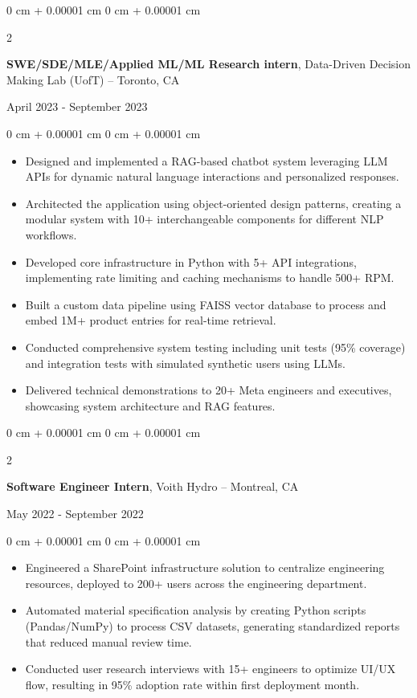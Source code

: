 \documentclass[10pt, letterpaper]{article}
\newenvironment{highlights}{
    \begin{itemize}[
        topsep=0.08 cm,
        parsep=0.08 cm,
        partopsep=0pt,
        itemsep=0pt,
        leftmargin=0.2 cm + 17pt
    ]
}
{
    \end{itemize}
}
\newenvironment{onecolentry}{
    \begin{adjustwidth}{
        0 cm + 0.00001 cm
    }{
        0 cm + 0.00001 cm
    }
}{
    \end{adjustwidth}
}
\newenvironment{twocolentry}[2][]{
    \onecolentry
    \def\secondColumn{#2}
    \setcolumnwidth{\fill, 4.5 cm}
    \begin{paracol}{2}
}{
    \switchcolumn \raggedleft \secondColumn
    \end{paracol}
    \endonecolentry
}
\begin{document}
\begin{twocolentry}{April 2023 - September 2023}
    {\textbf{SWE/SDE/MLE/Applied ML/ML Research intern}}, Data-Driven Decision Making Lab (UofT) -- Toronto, CA
\end{twocolentry}
\vspace{0.1cm}
\begin{onecolentry}
    \begin{highlights}
        \item Designed and implemented a RAG-based chatbot system leveraging LLM APIs for dynamic natural language interactions and personalized responses.
        \item Architected the application using object-oriented design patterns, creating a modular system with 10+ interchangeable components for different NLP workflows.
        \item Developed core infrastructure in Python with 5+ API integrations, implementing rate limiting and caching mechanisms to handle 500+ RPM.
        \item Built a custom data pipeline using FAISS vector database to process and embed 1M+ product entries for real-time retrieval.
        \item Conducted comprehensive system testing including unit tests (95\% coverage) and integration tests with simulated synthetic users using LLMs.
        \item Delivered technical demonstrations to 20+ Meta engineers and executives, showcasing system architecture and RAG features.
    \end{highlights}
\end{onecolentry}
\vspace{0.35 cm}

\begin{twocolentry}{May 2022 - September 2022}
    {\textbf{Software Engineer Intern}}, Voith Hydro -- Montreal, CA
\end{twocolentry}
\vspace{0.1cm}
\begin{onecolentry}
    \begin{highlights}
        \item Engineered a SharePoint infrastructure solution to centralize engineering resources, deployed to 200+ users across the engineering department.
        \item Automated material specification analysis by creating Python scripts (Pandas/NumPy) to process CSV datasets, generating standardized reports that reduced manual review time.
        \item Conducted user research interviews with 15+ engineers to optimize UI/UX flow, resulting in 95\% adoption rate within first deployment month.
    \end{highlights}
\end{onecolentry}
\end{document}
